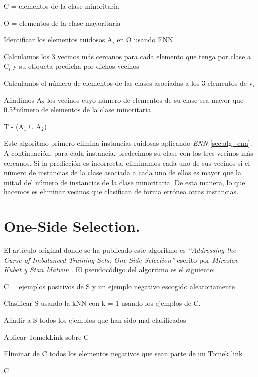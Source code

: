 \begin{codigo}
\begin{algorithmic}[1]
\State \parbox[t]{305pt}{C = elementos de la clase minoritaria\strut}
\State \parbox[t]{305pt}{O = elementos de la clase mayoritaria\strut}
\State \parbox[t]{305pt}{Identificar los elementos ruidosos A$_i$ en O usando ENN\strut}
\State \parbox[t]{295pt}{Calculamos los 3 vecinos más cercanos para cada elemento que tenga por clase a C$_i$ y su etiqueta predicha por dichos vecinos\strut}
\State \parbox[t]{270pt}{Calculamos el número de elementos de las clases asociadas a los 3 elementos de v$_i$\strut}
\State \parbox[t]{270pt}{Añadimos A$_2$ los vecinos cuyo número de elementos de su clase sea mayor que 0.5*número de elementos de la clase minoritaria \strut}
\EndIf
\EndFor
\EndFor
\State \Return T - (A$_1$ $\cup$ A$_2$)
\EndFunction 
\end{algorithmic}
\end{codigo}

Este algoritmo primero elimina instancias ruidosas aplicando \textit{ENN} \ref{sec:alg_enn}. A continuación, para cada instancia, predecimos su clase con los tres vecinos más cercanos. Si la predicción es incorrecta, eliminamos cada uno de sus vecinos si el número de instancias de la clase asociada a cada uno de ellos es mayor que la mitad del número de instancias de la clase minoritaria. De esta manera, lo que hacemos es eliminar vecinos que clasifican de forma errónea otras instancias.

\section{One-Side Selection.} \label{sec:alg_oss}
El artículo original donde se ha publicado este algoritmo es \textit{``Addressing the Curse of Imbalanced Training Sets: One-Side Selection''} escrito por \textit{Miroslav Kubat y Stan Matwin} \cite{oss}. El pseudocódigo del algoritmo es el siguiente:

\begin{codigo}
\begin{algorithmic}[1]
\State \parbox[t]{305pt}{C = ejemplos positivos de S y un ejemplo negativo escogido aleatoriamente\strut}
\State \parbox[t]{305pt}{Clasificar S usando la kNN con k = 1 usando los ejemplos de C.\strut}
\State \parbox[t]{305pt}{Añadir a S todos los ejemplos que han sido mal clasificados\strut}
\State \parbox[t]{305pt}{Aplicar TomekLink sobre C\strut}
\State \parbox[t]{305pt}{Eliminar de C todos los elementos negativos que sean parte de un Tomek link\strut}
\State \Return C
\EndFunction 
\end{algorithmic}
\end{codigo}

